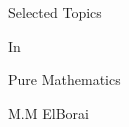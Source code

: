 \begingroup
{}
\thispagestyle{empty}
\color{cover}
\begin{center}
    {\fontsize{50pt}{30pt}\selectfont\Acmefont
        Selected Topics\par
        In\par
        Pure Mathematics
    }
    \par
    \vspace*{17cm}
    {\fontsize{20pt}{30pt}\selectfont
        M.M ElBorai 
    }
\end{center}
\endgroup

\newpage
\thispagestyle{empty}

